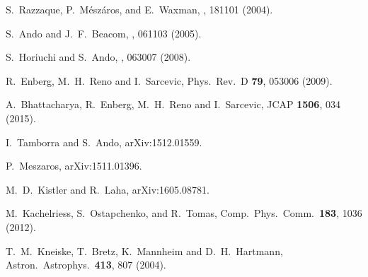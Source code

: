\documentclass[aps,prd,nofootinbib,twocolumn,floatfix,letterpaper,superscriptaddress,showpacs]{revtex4}
\begin{document}
\begin{thebibliography}{99}
  S.\ Razzaque, P.\ M{\'e}sz{\'a}ros, and E.\ Waxman,
  , 181101 (2004).

  S.\ Ando and J.~F.\ Beacom,
  , 061103 (2005).

  S.\ Horiuchi and S.\ Ando,
  , 063007 (2008).

  R.~Enberg, M.~H.~Reno and I.~Sarcevic,
  Phys.\ Rev.\ D {\bf 79}, 053006 (2009).

  A.~Bhattacharya, R.~Enberg, M.~H.~Reno and I.~Sarcevic,
  JCAP {\bf 1506}, 034 (2015).

  I.~Tamborra and S.~Ando,
  arXiv:1512.01559.


  P.~Meszaros,
  arXiv:1511.01396.



  M.~D.\ Kistler and R.\ Laha,
  arXiv:1605.08781.


  M.\ Kachelriess, S.\ Ostapchenko, and R.\ Tomas,
  Comp.\ Phys.\ Comm.\  {\bf 183}, 1036 (2012).

  T.~M.~Kneiske, T.~Bretz, K.~Mannheim and D.~H.~Hartmann,
  Astron.\ Astrophys.\  {\bf 413}, 807 (2004).



\end{thebibliography}
\end{document}
